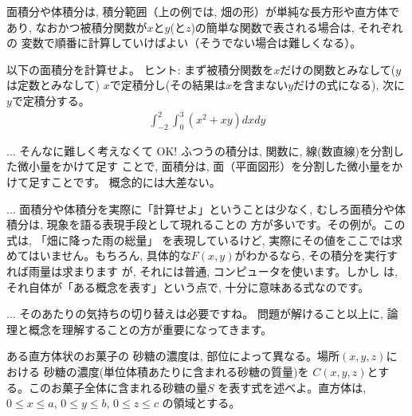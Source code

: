 面積分や体積分は, 積分範囲（上の例では, 畑の形）が単純な長方形や直方体であり, 
なおかつ被積分関数が$x$と$y$(と$z$)の簡単な関数で表される場合は, それぞれの
変数で順番に計算していけばよい（そうでない場合は難しくなる）。

\begin{q}\label{q:mensekibun01} 以下の面積分を計算せよ。
ヒント: まず被積分関数を$x$だけの関数とみなして($y$は定数とみなして)
$x$で定積分し(その結果は$x$を含まない$y$だけの式になる), 次に$y$で定積分する。
\begin{eqnarray}
\int_{-2}^{2}\int_{0}^{3}(x^2+xy)dxdy
\end{eqnarray}
\end{q}
\mv

\begin{faq}{\small{} ... そんなに難しく考えなくて
OK! ふつうの積分は, 関数に, 線(数直線)を分割した微小量をかけて足す
ことで, 面積分は, 面（平面図形）を分割した微小量をかけて足すことです。
概念的には大差ない。}\end{faq}
\mv

\begin{faq}{\small{}
 ... 面積分や体積分を実際に「計算せよ」ということは少なく, 
むしろ面積分や体積分は, 現象を語る表現手段として現れることの
方が多いです。その例が。この式は, 「畑に降った雨の総量」
を表現しているけど, 実際にその値をここでは求めてはいません。もちろん, 
具体的な$F(x, y)$がわかるなら, その積分を実行すれば雨量は求まります
が, それには普通, コンピュータを使います。しかし
は, それ自体が「ある概念を表す」という点で, 十分に意味ある式なのです。}\end{faq}
\mv

\begin{faq}{\small{} ... そのあたりの気持ちの切り替えは必要ですね。
問題が解けること以上に, 論理と概念を理解することの方が重要になってきます。}\end{faq}
\mv

\begin{q}\label{q:integ_okashi0} ある直方体状のお菓子の
砂糖の濃度は, 部位によって異なる。場所$(x, y, z)$における
砂糖の濃度(単位体積あたりに含まれる砂糖の質量)を
$C(x, y, z)$とする。このお菓子全体に含まれる砂糖の量$S$
を表す式を述べよ。直方体は, $0\leq x\leq a$, $0\leq y\leq b$, $0\leq z\leq c$
の領域とする。
\end{q}
\hv



